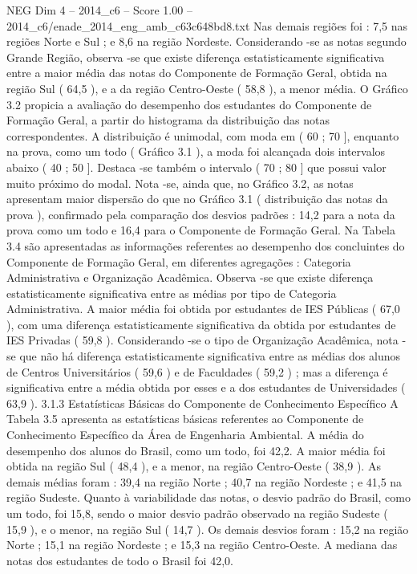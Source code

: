 \begin{textsample}{NEG Dim 4 – 2014\_c6 – Score 1.00 – 2014\_c6/enade\_2014\_eng\_amb\_c63c648bd8.txt}
Nas demais regiões foi : 7,5 nas regiões Norte e Sul ; e 8,6 na região Nordeste.
Considerando -se as notas segundo Grande Região, observa -se que existe diferença estatisticamente significativa entre a maior média das notas do Componente de Formação Geral, obtida na região Sul ( 64,5 ), e a da região Centro-Oeste ( 58,8 ), a menor média.
O Gráfico 3.2 propicia a avaliação do desempenho dos estudantes do Componente de Formação Geral, a partir do histograma da distribuição das notas correspondentes.
A distribuição é unimodal, com moda em ( 60 ; 70 ], enquanto na prova, como um todo ( Gráfico 3.1 ), a moda foi alcançada dois intervalos abaixo ( 40 ; 50 ].
Destaca -se também o intervalo ( 70 ; 80 ] que possui valor muito próximo do modal.
Nota -se, ainda que, no Gráfico 3.2, as notas apresentam maior dispersão do que no Gráfico 3.1 ( distribuição das notas da prova ), confirmado pela comparação dos desvios padrões : 14,2 para a nota da prova como um todo e 16,4 para o Componente de Formação Geral.
Na Tabela 3.4 são apresentadas as informações referentes ao desempenho dos concluintes do Componente de Formação Geral, em diferentes agregações : Categoria Administrativa e Organização Acadêmica.
Observa -se que existe diferença estatisticamente significativa entre as médias por tipo de Categoria Administrativa.
A maior média foi obtida por estudantes de IES Públicas ( 67,0 ), com uma diferença estatisticamente significativa da obtida por estudantes de IES Privadas ( 59,8 ).
Considerando -se o tipo de Organização Acadêmica, nota -se que não há diferença estatisticamente significativa entre as médias dos alunos de Centros Universitários ( 59,6 ) e de Faculdades ( 59,2 ) ; mas a diferença é significativa entre a média obtida por esses e a dos estudantes de Universidades ( 63,9 ). 3.1.3 Estatísticas Básicas do Componente de Conhecimento Específico A Tabela 3.5 apresenta as estatísticas básicas referentes ao Componente de Conhecimento Específico da Área de Engenharia Ambiental.
A média do desempenho dos alunos do Brasil, como um todo, foi 42,2.
A maior média foi obtida na região Sul ( 48,4 ), e a menor, na região Centro-Oeste ( 38,9 ).
As demais médias foram : 39,4 na região Norte ; 40,7 na região Nordeste ; e 41,5 na região Sudeste.
Quanto à variabilidade das notas, o desvio padrão do Brasil, como um todo, foi 15,8, sendo o maior desvio padrão observado na região Sudeste ( 15,9 ), e o menor, na região Sul ( 14,7 ).
Os demais desvios foram : 15,2 na região Norte ; 15,1 na região Nordeste ; e 15,3 na região Centro-Oeste.
A mediana das notas dos estudantes de todo o Brasil foi 42,0.

\end{textsample}
